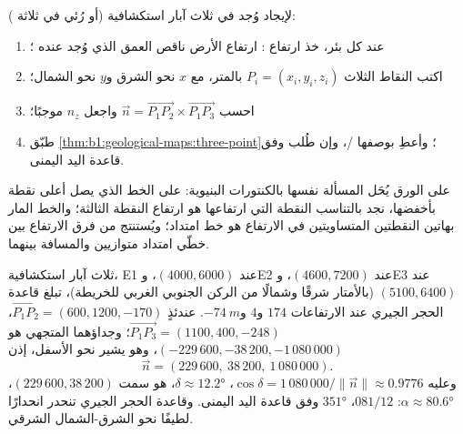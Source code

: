 \begin{method}\label{met:b1:geological-maps:three-point}
لإيجاد   وُجد في ثلاث آبار استكشافية (أو رُئي في ثلاثة ):
\begin{enumerate}
  \item عند كل بئر، خذ ارتفاع : ارتفاع الأرض ناقص العمق الذي وُجد عنده ؛
  \item اكتب النقاط الثلاث $P_i = (x_i, y_i, z_i)$ بالمتر، مع $x$ نحو الشرق و$y$ نحو الشمال؛
  \item احسب $\vec n = \overrightarrow{P_1P_2} \times
        \overrightarrow{P_1P_3}$ واجعل $n_z$ موجبًا؛
  \item طبّق \cref{thm:b1:geological-maps:three-point}؛ وأعطِ 
        بوصفها /، وإن طُلب  وفق قاعدة اليد اليمنى.
\end{enumerate}
على الورق يُحَل المسألة نفسها بالكنتورات البنيوية: على الخط الذي يصل أعلى نقطة بأخفضها، نجد بالتناسب النقطة التي ارتفاعها هو ارتفاع النقطة الثالثة؛ والخط المار بهاتين النقطتين المتساويتين في الارتفاع هو خط امتداد؛ ويُستنتج  من فرق الارتفاع بين خطّي امتداد متوازيين والمسافة بينهما.
\end{method}

\begin{example}\label{ex:b1:geological-maps:east}
ثلاث آبار استكشافية، E1 عند $(4000, 6000)$، وE2 عند $(4600, 7200)$، وE3 عند
$(5100, 6400)$ (بالأمتار شرقًا وشمالًا من الركن الجنوبي الغربي للخريطة)، تبلغ قاعدة الحجر الجيري عند الارتفاعات $174$ و$4$ و$\qty{-74}{m}$. عندئذٍ
$\overrightarrow{P_1P_2} = (600, 1200, -170)$،
$\overrightarrow{P_1P_3} = (1100, 400, -248)$؛ وجداؤهما المتجهي هو
$(-229\,600, -38\,200, -1\,080\,000)$، وهو يشير نحو الأسفل، إذن
\[
  \vec n = (229\,600,\ 38\,200,\ 1\,080\,000).
\]
وعليه $\cos\delta = 1\,080\,000/\|\vec n\| \approx
0.9776$، $\delta \approx \ang{12.2}$،  هو سمت
$(229\,600, 38\,200)$، $\alpha \approx \ang{80.6}$: 
$081/12$،  $\ang{351}$ وفق قاعدة اليد اليمنى. وقاعدة الحجر الجيري تنحدر انحدارًا لطيفًا نحو الشرق-الشمال الشرقي.
\end{example}

